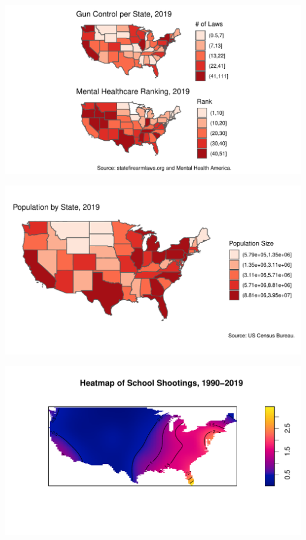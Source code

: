 \documentclass[
  12pt,
]{article}
\begin{document}
\includegraphics{JStevenRaquel_STATS295_Final_files/figure-latex/plot-gc-mhc-1.pdf}

\includegraphics{JStevenRaquel_STATS295_Final_files/figure-latex/plot-pop-1.pdf}

\includegraphics{JStevenRaquel_STATS295_Final_files/figure-latex/density-90-19-1.pdf}
\end{document}
